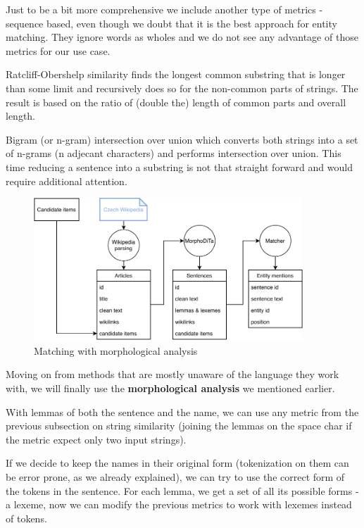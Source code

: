  Just to be a bit more comprehensive we include another type of metrics - sequence based, even though we doubt that it is the best approach for entity matching. They ignore words as wholes and we do not see any advantage of those metrics for our use case. 

Ratcliff-Obershelp similarity finds the longest common substring that is longer than some limit and recursively does so for the non-common parts of strings. The result is based on the ratio of (double the) length of common parts and overall length. 

Bigram (or n-gram) intersection over union which converts both strings into a set of n-grams (n adjecant characters) and performs intersection over union. This time reducing a sentence into a substring is not that straight forward and would require additional attention.



\begin{figure}[h]\centering
\includegraphics[width=0.9\textwidth]{./img/Diplomka diagramy-Detailed_text}
\caption{Matching with morphological analysis}
\label{obr:DiagramTextDetail}
\end{figure}

Moving on from methods that are mostly unaware of the language they work with, we will finally use the \textbf{morphological analysis} we mentioned earlier.

With lemmas of both the sentence and the name, we can use any metric from the previous subsection on string similarity (joining the lemmas on the space char if the metric expect only two input strings).


If we decide to keep the names in their original form (tokenization on them can be error prone, as we already explained), we can try to use the correct form of the tokens in the sentence. For each lemma, we get a set of all its possible forms - a lexeme, now we can modify the previous metrics to work with lexemes instead of tokens. 


